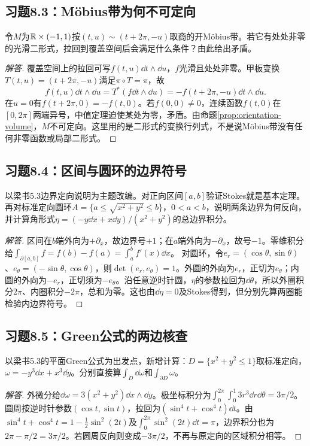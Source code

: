 \subsection*{习题8.3：Möbius带为何不可定向}
令$M$为$\mathbb{R}\times(-1,1)$按$(t,u)\sim(t+2\pi,-u)$取商的开Möbius带。若它有处处非零的光滑二形式，拉回到覆盖空间后会满足什么条件？由此给出矛盾。
\begin{proof}[解答]
覆盖空间上的拉回可写$f(t,u)\dd t\wedge\dd u$，$f$光滑且处处非零。甲板变换$T(t,u)=(t+2\pi,-u)$满足$\pi\circ T=\pi$，故
\[
 f(t,u)\dd t\wedge\dd u
 =T^*(f\dd t\wedge\dd u)
 =-f(t+2\pi,-u)\dd t\wedge\dd u.
\]
在$u=0$有$f(t+2\pi,0)=-f(t,0)$。若$f(0,0)\ne0$，连续函数$f(t,0)$在$[0,2\pi]$两端异号，中值定理迫使某处为零，矛盾。由命题\ref{prop:orientation-volume}，$M$不可定向。这里用的是二形式的变换行列式，不是说Möbius带没有任何非零函数或局部二形式。
\end{proof}

\subsection*{习题8.4：区间与圆环的边界符号}
以梁书5.3边界定向说明为主题改编。对正向区间$[a,b]$验证Stokes就是基本定理。再对标准定向圆环$A=\{a\leq\sqrt{x^2+y^2}\leq b\}$，$0<a<b$，说明两条边界为何反向，并计算角形式$\eta=(-y\dd x+x\dd y)/(x^2+y^2)$的总边界积分。
\begin{proof}[解答]
区间在$b$端外向为$+\partial_x$，故边界号$+1$；在$a$端外向为$-\partial_x$，故号$-1$。零维积分给$\int_{\partial[a,b]}f=f(b)-f(a)=\int_a^b f'(x)\dd x$。
对圆环，令$e_r=(\cos\theta,\sin\theta)$、$e_\theta=(-\sin\theta,\cos\theta)$，则$\det(e_r,e_\theta)=1$。外圆的外向为$e_r$，正切为$e_\theta$；内圆的外向为$-e_r$，正切须为$-e_\theta$。沿任意逆时针圆，$\eta$的参数拉回为$\dd\theta$，所以外圈积分$2\pi$、内圈积分$-2\pi$，总和为零。这也由$\dd\eta=0$及Stokes得到，但分别先算两圈能检验内边界符号。
\end{proof}

\subsection*{习题8.5：Green公式的两边核查}
以梁书5.3的平面Green公式为出发点，新增计算：$D=\{x^2+y^2\leq1\}$取标准定向，$\omega=-y^3\dd x+x^3\dd y$。分别直接算$\int_D\dd\omega$和$\int_{\partial D}\omega$。
\begin{proof}[解答]
外微分给$\dd\omega=3(x^2+y^2)\dd x\wedge\dd y$。极坐标积分为$\int_0^{2\pi}\int_0^1 3r^3\dd r\dd\theta=3\pi/2$。圆周按逆时针参数$(\cos t,\sin t)$，拉回为$(\sin^4t+\cos^4t)\dd t$。由$\sin^4t+\cos^4t=1-\tfrac12\sin^2(2t)$及$\int_0^{2\pi}\sin^2(2t)\dd t=\pi$，边界积分也为$2\pi-\pi/2=3\pi/2$。若圆周反向则变成$-3\pi/2$，不再与原定向的区域积分相等。
\end{proof}

